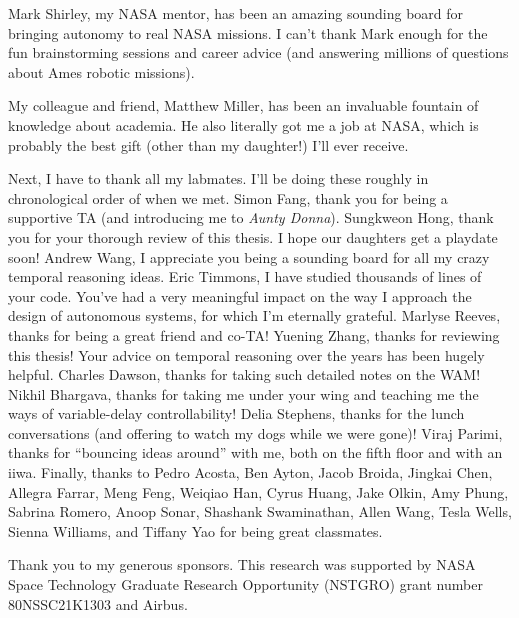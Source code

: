 \documentclass[12pt,vi,leftblank,twoside]{mitthesis}
\begin{document}
Mark Shirley, my NASA mentor, has been an amazing sounding board for bringing autonomy to real NASA
missions. I can't thank Mark enough for the fun brainstorming sessions and career advice (and
answering millions of questions about Ames robotic missions).

My colleague and friend, Matthew Miller, has been an invaluable fountain of knowledge about
academia. He also literally got me a job at NASA, which is probably the best gift (other than my
daughter!) I'll ever receive.

Next, I have to thank all my labmates. I'll be doing these roughly in chronological order of when we
met. Simon Fang, thank you for being a supportive TA (and introducing me to \emph{Aunty Donna}).
Sungkweon Hong, thank you for your thorough review of this thesis. I hope our daughters get a
playdate soon! Andrew Wang, I appreciate you being a sounding board for all my crazy temporal
reasoning ideas. Eric Timmons, I have studied thousands of lines of your code. You've had a very
meaningful impact on the way I approach the design of autonomous systems, for which I'm eternally
grateful. Marlyse Reeves, thanks for being a great friend and co-TA! Yuening Zhang, thanks for
reviewing this thesis! Your advice on temporal reasoning over the years has been hugely helpful.
Charles Dawson, thanks for taking such detailed notes on the WAM! Nikhil Bhargava, thanks for taking
me under your wing and teaching me the ways of variable-delay controllability! Delia Stephens,
thanks for the lunch conversations (and offering to watch my dogs while we were gone)! Viraj Parimi,
thanks for ``bouncing ideas around'' with me, both on the fifth floor and with an iiwa. Finally,
thanks to Pedro Acosta, Ben Ayton, Jacob Broida, Jingkai Chen, Allegra Farrar, Meng Feng, Weiqiao
Han, Cyrus Huang, Jake Olkin, Amy Phung, Sabrina Romero, Anoop Sonar, Shashank Swaminathan, Allen
Wang, Tesla Wells, Sienna Williams, and Tiffany Yao for being great classmates.

Thank you to my generous sponsors. This research was supported by NASA Space Technology Graduate
Research Opportunity (NSTGRO) grant number 80NSSC21K1303 and Airbus.

\pagestyle{plain}

\tableofcontents
\newpage
\listoffigures
\newpage
\renewcommand\listoflistingscaption{List of source codes}
\listoflistings
\newpage
\listoftables
\end{document}
